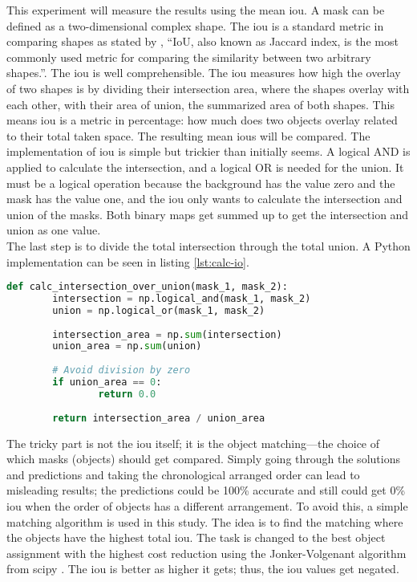 		This experiment will measure the results using the mean \acl{iou}. A mask can be defined as a two-dimensional complex shape. The \ac{iou} is a standard metric in comparing shapes as stated by \textcite{Rezatofighi2019}, \enquote{IoU, also known as Jaccard index, is the most commonly used metric for comparing the similarity between two arbitrary shapes.}. The \ac{iou} is well comprehensible. The \ac{iou} measures how high the overlay of two shapes is by dividing their intersection area, where the shapes overlay with each other, with their area of union, the summarized area of both shapes. This means \ac{iou} is a metric in percentage: how much does two objects overlay related to their total taken space. The resulting mean \ac{iou}s will be compared.
		\clearpage
		The implementation of \ac{iou} is simple but trickier than initially seems. A logical AND is applied to calculate the intersection, and a logical OR is needed for the union. It must be a logical operation because the background has the value zero and the mask has the value one, and the \ac{iou} only wants to calculate the intersection and union of the masks. Both binary maps get summed up to get the intersection and union as one value. \\
		The last step is to divide the total intersection through the total union. A Python implementation can be seen in listing \ref{lst:calc-io}.
		\begin{lstlisting}[language=Python,caption=Calculate the \acl{iou} between two single masks, label=lst:calc-io]
def calc_intersection_over_union(mask_1, mask_2):
		intersection = np.logical_and(mask_1, mask_2)
		union = np.logical_or(mask_1, mask_2)
		
		intersection_area = np.sum(intersection)
		union_area = np.sum(union)
		
		# Avoid division by zero
		if union_area == 0:
				return 0.0
		
		return intersection_area / union_area
		\end{lstlisting}
		
		The tricky part is not the \ac{iou} itself; it is the object matching—the choice of which masks (objects) should get compared. Simply going through the solutions and predictions and taking the chronological arranged order can lead to misleading results; the predictions could be 100\% accurate and still could get 0\% \ac{iou} when the order of objects has a different arrangement. To avoid this, a simple matching algorithm is used in this study. The idea is to find the matching where the objects have the highest total \ac{iou}. The task is changed to the best object assignment with the highest cost reduction using the Jonker-Volgenant algorithm \cite{Jonker1987} from scipy \cite{scipy}. The \ac{iou} is better as higher it gets; thus, the \ac{iou} values get negated. 
		
